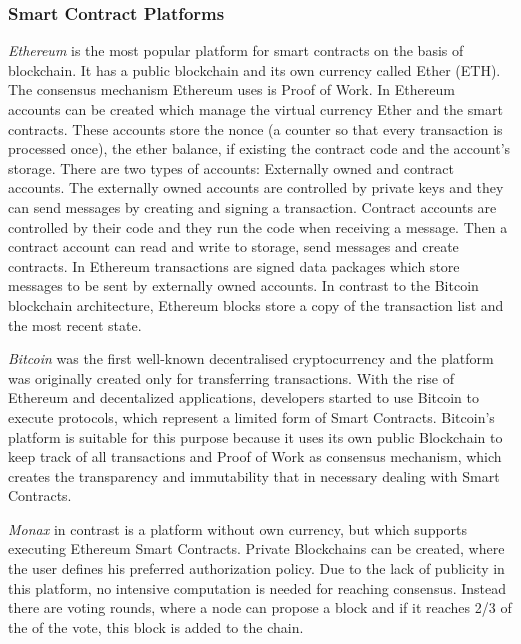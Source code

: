 \documentclass[conference]{IEEEtran}
\begin{document}
\subsubsection{Smart Contract Platforms}
\textit{Ethereum} is the most popular platform for smart contracts on the basis of blockchain. \cite{Meitinger2017} It has a public blockchain and its own currency called Ether (ETH). The consensus mechanism Ethereum uses is Proof of Work. In Ethereum accounts can be created which manage the virtual currency Ether and the smart contracts. \cite{Bartoletti2017} These accounts store the nonce (a counter so that every transaction is processed once), the ether balance, if existing the contract code and the account's storage. There are two types of accounts: Externally owned and contract accounts. The externally owned accounts are controlled by private keys and they can send messages by creating and signing a transaction. Contract accounts are controlled by their code and they run the code when receiving a message. Then a contract account can read and write to storage, send messages and create contracts. In Ethereum transactions are signed data packages which store messages to be sent by externally owned accounts. In contrast to the Bitcoin blockchain architecture, Ethereum blocks store a copy of the transaction list and the most recent state. \cite{Buterin2014}  \par
\textit{Bitcoin} was the first well-known decentralised cryptocurrency and the platform was originally created only for transferring transactions. With the rise of Ethereum and decentalized applications, developers started to use Bitcoin to execute protocols, which represent a limited form of Smart Contracts. Bitcoin's platform is suitable for this purpose because it uses its own public Blockchain to keep track of all transactions and Proof of Work as consensus mechanism, which creates the transparency and immutability that in necessary dealing with Smart Contracts. \cite{Bartoletti2017} \par 
\textit{Monax} in contrast is a platform without own currency, but which supports executing Ethereum Smart Contracts. Private Blockchains can be created, where the user defines his preferred authorization policy. Due to the lack of publicity in this platform, no intensive computation is needed for reaching consensus. Instead there are voting rounds, where a node can propose a block and if it reaches 2/3 of the of the vote, this block is added to the chain. \cite{Bartoletti2017} \par 
\end{document}
